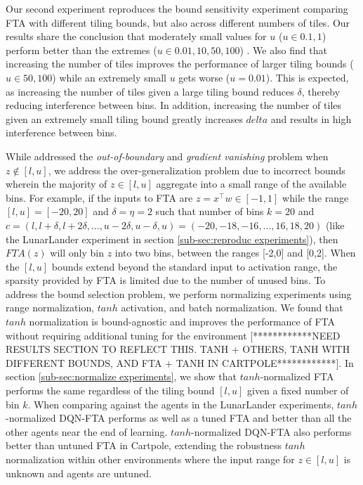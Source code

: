 \documentclass{article}
\begin{document}
Our second experiment reproduces the bound sensitivity experiment comparing FTA with different tiling bounds, but also across different numbers of tiles. Our results share the conclusion that moderately small values for $u$ ($u \in {0.1, 1}$) perform better than the extremes ($u \in {0.01, 10, 50, 100}$) \cite[]{pan2019fuzzy}. We also find that increasing the number of tiles improves the performance of larger tiling bounds ($u \in {50, 100}$) while an extremely small $u$ gets worse ($u = 0.01$). This is expected, as increasing the number of tiles given a large tiling bound reduces $\delta$, thereby reducing interference between bins. In addition, increasing the number of tiles given an extremely small tiling bound greatly increases $delta$ and results in high interference between bins.

While \cite{pan2019fuzzy} addressed the \textit{out-of-boundary} and \textit{gradient vanishing} problem when $z \notin [l,u]$, we address the over-generalization problem due to incorrect bounds wherein the majority of $z \in [l,u]$ aggregate into a small range of the available bins. For example, if the inputs to FTA are $z = x^\top w \in [-1,1]$ while the range $[l,u] = [-20,20]$ and $\delta = \eta = 2$ such that number of bins $k=20$ and $c=(l, l+\delta, l+2\delta, ..., u-2\delta, u-\delta, u) = (-20, -18, -16, ..., 16, 18, 20)$ (like the LunarLander experiment in section \ref{sub-sec:reproduc experiments}), then $FTA(z)$ will only bin $z$ into two bins, between the ranges [-2,0] and [0,2]. When the $[l,u]$ bounds extend beyond the standard input to activation range, the sparsity provided by FTA is limited due to the number of unused bins. To address the bound selection problem, we perform normalizing experiments using range normalization, $tanh$ activation, and batch normalization. We found that $tanh$ normalization is bound-agnostic and improves the performance of FTA without requiring additional tuning for the environment [************NEED RESULTS SECTION TO REFLECT THIS. TANH + OTHERS, TANH WITH DIFFERENT BOUNDS, AND FTA + TANH IN CARTPOLE************]. In section \ref{sub-sec:normalize experiments}, we show that $tanh$-normalized FTA performs the same regardless of the tiling bound $[l,u]$ given a fixed number of bin $k$. When comparing against the agents in the LunarLander experiments, $tanh$-normalized DQN-FTA performs as well as a tuned FTA and better than all the other agents near the end of learning. $tanh$-normalized DQN-FTA also performs better than untuned FTA in Cartpole, extending the robustness $tanh$ normalization within other environments where the input range for $z \in [l,u]$ is unknown and agents are untuned. 
\end{document}
